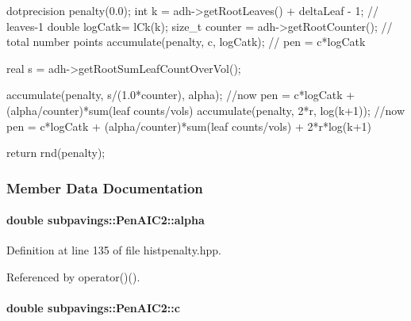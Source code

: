 \begin{DoxyCode}
      {
          dotprecision penalty(0.0);
          int k = adh->getRootLeaves() + deltaLeaf - 1; // leaves-1
          double logCatk= lCk(k);
          size_t counter = adh->getRootCounter(); // total number points
          accumulate(penalty, c, logCatk); // pen = c*logCatk
  
          real s = adh->getRootSumLeafCountOverVol();
  
          accumulate(penalty, s/(1.0*counter), alpha);
          //now pen = c*logCatk + (alpha/counter)*sum(leaf counts/vols)
          accumulate(penalty, 2*r, log(k+1));
          //now pen = c*logCatk + (alpha/counter)*sum(leaf counts/vols) +
       2*r*log(k+1)
  
          return rnd(penalty);
      }
\end{DoxyCode}


\subsubsection{\-Member \-Data \-Documentation}
\hypertarget{classsubpavings_1_1PenAIC2_af9f26869dfdd1bd60470da30fe3d3bf9}{
\paragraph[{alpha}]{\setlength{\rightskip}{0pt plus 5cm}double {\bf subpavings\-::\-Pen\-A\-I\-C2\-::alpha}}}\label{classsubpavings_1_1PenAIC2_af9f26869dfdd1bd60470da30fe3d3bf9}


\-Definition at line 135 of file histpenalty.\-hpp.



\-Referenced by operator()().

\hypertarget{classsubpavings_1_1PenAIC2_ae8ecf3533342ef935f948f0c0ad0d0e3}{
\paragraph[{c}]{\setlength{\rightskip}{0pt plus 5cm}double {\bf subpavings\-::\-Pen\-A\-I\-C2\-::c}}}\label{classsubpavings_1_1PenAIC2_ae8ecf3533342ef935f948f0c0ad0d0e3}


